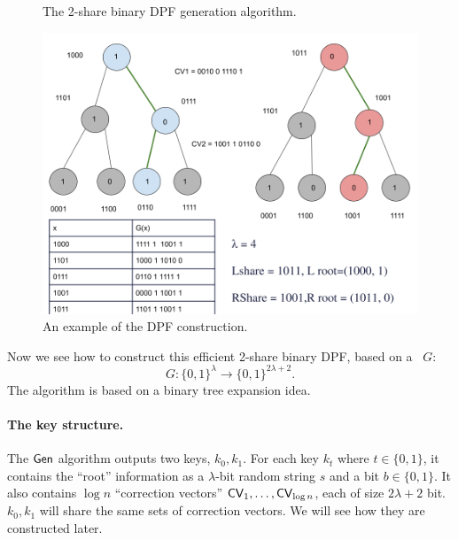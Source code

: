 \begin{figure}
\begin{minipage}{\textwidth}
\begin{mdframed}
        \end{mdframed}
    \end{minipage}
    \caption{The 2-share binary DPF generation algorithm.\label{fig:DPF}}
\end{figure}

\begin{figure}
    \centering
    \includegraphics[scale=0.4]{scribimg_dpftree.png}
    \caption{An example of the DPF construction.\label{fig:example-DPF}}
\end{figure}


Now we see how to construct this efficient 2-share binary DPF, based on a \Prg~$G$:
 $$G: \{0,1\}^{\lambda} \rightarrow  \{0,1\}^{2\lambda + 2}. $$
The algorithm is based on a binary tree expansion idea.
 
\paragraph{The key structure.} The ${\sf Gen}$ algorithm outputs two keys, $k_0, k_1$. For each key $k_t$ where $t\in\{0,1\}$, it contains the ``root'' information as a $\lambda$-bit random string $s$ and a bit $b\in\{0,1\}$. It also contains $\log n$ ``correction vectors'' ${\sf CV}_1, \dots, {\sf CV}_{\log n}$, each of size $2\lambda+2$ bit. $k_0, k_1$ will share the same sets of correction vectors. 
We will see how they are constructed later. 


